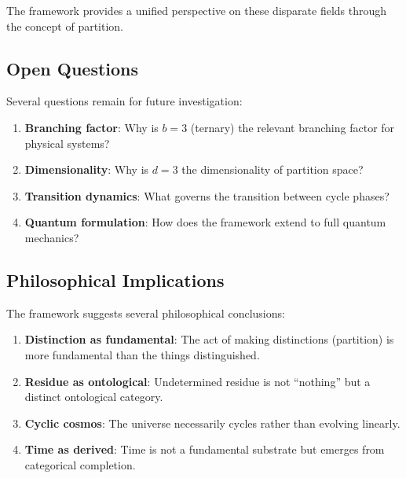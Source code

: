 \documentclass[twocolumn,10pt,a4paper]{article}
\theoremstyle{definition}
\theoremstyle{remark}
\begin{document}
The framework provides a unified perspective on these disparate fields through the concept of partition.

\subsection{Open Questions}

Several questions remain for future investigation:

\begin{enumerate}
    \item \textbf{Branching factor}: Why is $b = 3$ (ternary) the relevant branching factor for physical systems?

    \item \textbf{Dimensionality}: Why is $d = 3$ the dimensionality of partition space?

    \item \textbf{Transition dynamics}: What governs the transition between cycle phases?

    \item \textbf{Quantum formulation}: How does the framework extend to full quantum mechanics?
\end{enumerate}

\subsection{Philosophical Implications}

The framework suggests several philosophical conclusions:

\begin{enumerate}
    \item \textbf{Distinction as fundamental}: The act of making distinctions (partition) is more fundamental than the things distinguished.

    \item \textbf{Residue as ontological}: Undetermined residue is not ``nothing'' but a distinct ontological category.

    \item \textbf{Cyclic cosmos}: The universe necessarily cycles rather than evolving linearly.

    \item \textbf{Time as derived}: Time is not a fundamental substrate but emerges from categorical completion.
\end{enumerate}

\end{document}
